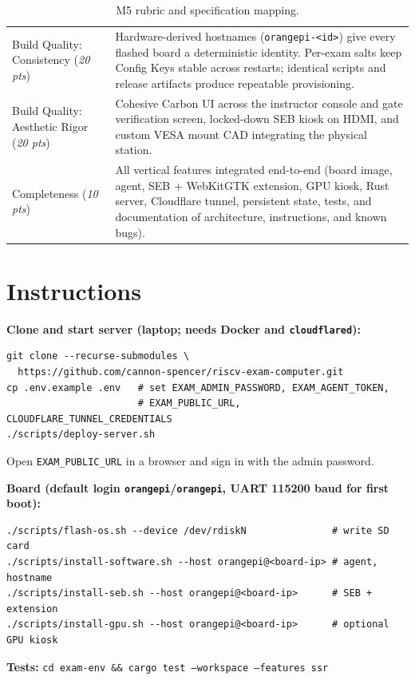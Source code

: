 \documentclass[11pt]{article}
\begin{document}
\begin{table}[H]
\begin{tabularx}{\textwidth}{@{}p{} >{\raggedright\arraybackslash}X@{}}
    Build Quality: Consistency \newline (\textit{20 pts}) &
    Hardware-derived hostnames (\texttt{orangepi-<id>}) give every flashed board a deterministic identity. Per-exam salts keep Config Keys stable across restarts; identical scripts and release artifacts produce repeatable provisioning. \\
    Build Quality: Aesthetic Rigor \newline (\textit{20 pts}) &
    Cohesive Carbon UI across the instructor console and gate verification screen, locked-down SEB kiosk on HDMI, and custom VESA mount CAD integrating the physical station. \\
    Completeness \newline (\textit{10 pts}) &
    All vertical features integrated end-to-end (board image, agent, SEB + WebKitGTK extension, GPU kiosk, Rust server, Cloudflare tunnel, persistent state, tests, and documentation of architecture, instructions, and known bugs). \\
    \bottomrule
  \end{tabularx}
  \caption{M5 rubric and specification mapping.}
  \label{tab:rubric}
\end{table}

\section{Instructions}

{\small
\textbf{Clone and start server (laptop; needs Docker and \texttt{cloudflared}):}
\begin{verbatim}
git clone --recurse-submodules \
  https://github.com/cannon-spencer/riscv-exam-computer.git
cp .env.example .env   # set EXAM_ADMIN_PASSWORD, EXAM_AGENT_TOKEN,
                       # EXAM_PUBLIC_URL, CLOUDFLARE_TUNNEL_CREDENTIALS
./scripts/deploy-server.sh
\end{verbatim}
Open \texttt{EXAM\_PUBLIC\_URL} in a browser and sign in with the admin password.

\textbf{Board (default login \texttt{orangepi}/\texttt{orangepi}, UART 115200 baud for first boot):}
\begin{verbatim}
./scripts/flash-os.sh --device /dev/rdiskN               # write SD card
./scripts/install-software.sh --host orangepi@<board-ip> # agent, hostname
./scripts/install-seb.sh --host orangepi@<board-ip>      # SEB + extension
./scripts/install-gpu.sh --host orangepi@<board-ip>      # optional GPU kiosk
\end{verbatim}

\textbf{Tests:} \texttt{cd exam-env \&\& cargo test --workspace --features ssr}
}
\end{document}
